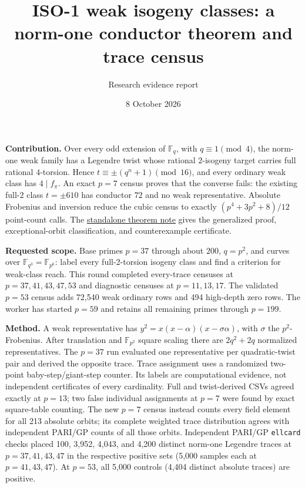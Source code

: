 \documentclass[10pt]{extarticle}
\title{ISO-1 weak isogeny classes: a norm-one conductor theorem and trace census}
\author{Research evidence report}
\date{8 October 2026}
\begin{document}
\maketitle

\noindent\textbf{Contribution.} Over every odd extension of
$\mathbb F_q$, with $q\equiv1\pmod4$, the norm-one weak family has a
Legendre twist whose rational $2$-isogeny target carries full rational
$4$-torsion. Hence $t\equiv\pm(q^n+1)\pmod{16}$, and every ordinary
weak class has $4\mid f_\pi$. An exact $p=7$ census proves that the
converse fails: the existing full-$2$ class $t=\pm610$ has conductor
$72$ and no weak representative. Absolute Frobenius and inversion reduce
the cubic census to exactly $(p^4+3p^2+8)/12$ point-count calls.
The \href{THEOREM.pdf}{standalone theorem note} gives the generalized
proof, exceptional-orbit classification, and counterexample certificate.

\medskip
\noindent\textbf{Requested scope.} Base primes $p=37$ through about $200$,
$q=p^2$, and curves over $\mathbb F_{q^3}=\mathbb F_{p^6}$: label every
full-2-torsion isogeny class and find a criterion for weak-class reach.
This round completed every-trace censuses at $p=37,41,43,47,53$ and diagnostic
censuses at $p=11,13,17$. The validated $p=53$ census adds 72,540 weak
ordinary rows and 494 high-depth zero rows. The worker has started $p=59$
and retains all remaining primes through $p=199$.

\medskip
\noindent\textbf{Method.} A weak representative has
$y^2=x(x-\alpha)(x-\sigma\alpha)$, with $\sigma$ the $p^2$-Frobenius.
After translation and $\mathbb F_{p^2}$ square scaling there are
$2q^2+2q$ normalized representatives. The $p=37$ run evaluated one
representative per quadratic-twist pair and derived the opposite trace.
Trace assignment uses a randomized two-point baby-step/giant-step
counter. Its labels are computational evidence, not independent
certificates of every cardinality. Full and twist-derived CSVs agreed
exactly at $p=13$; two false individual assignments at $p=7$ were found
by exact square-table counting. The new $p=7$ census instead counts every
field element for all 213 absolute orbits; its complete weighted trace
distribution agrees with independent PARI/GP counts of all those orbits.
Independent PARI/GP \texttt{ellcard} checks placed 100, 3,952, 4,043,
and 4,200 distinct norm-one Legendre traces at $p=37,41,43,47$ in the
respective positive sets (5,000 samples each at $p=41,43,47$).
At $p=53$, all 5,000 controls (4,404 distinct absolute traces) are positive.
\end{document}
